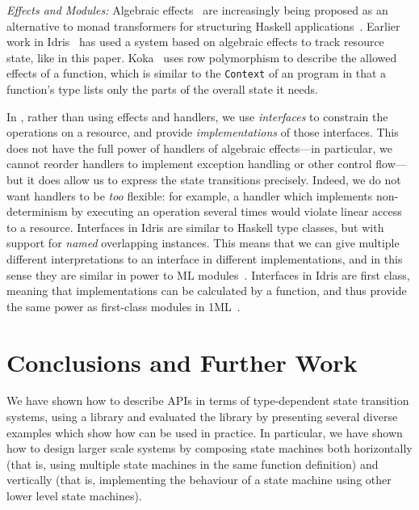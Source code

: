 
\emph{\textsf{Effects and Modules:}}
%
Algebraic effects~\citep{Plotkin2009,Bauer} are increasingly being proposed as
an alternative to monad transformers for structuring Haskell
applications~\citep{KiselyovEffects,handlers2013}.
Earlier work in Idris~\cite{brady-eff2013,brady-tfp14} has used a system
based on algebraic effects to track resource state, like \states{} in
this paper. 
Koka~\cite{Leijen2017} uses row polymorphism to describe the allowed effects
of a function, which is similar to the \texttt{Context} of an \states{}
program in that a function's type lists only the parts of the overall state it
needs.

In \states{}, rather than using effects and handlers, we use
\emph{interfaces} to constrain the operations on a resource, and provide
\emph{implementations} of those interfaces. This does not have the full
power of handlers of algebraic effects---in particular, we cannot reorder
handlers to implement exception handling or other control flow---but it
does allow us to express the state transitions precisely. Indeed, we do not
want handlers to be \emph{too} flexible: for example, a handler which
implements non-determinism by executing an operation several times would
violate linear access to a resource.
%
Interfaces in Idris are similar to Haskell type classes, but with support
for \emph{named} overlapping instances. This means that we can give multiple
different interpretations to an interface in different implementations, and
in this sense they are similar in power to ML modules~\citep{Dreyer2005}.
Interfaces in Idris are first class, meaning that implementations can be
calculated by a function, and thus provide the same power as first-class
modules in 1ML~\citep{rossberg2015}.

\section{Conclusions and Further Work}

We have shown how to describe APIs in terms of type-dependent state transition
systems, using a library \states{} and evaluated the library by presenting
several diverse examples which show how \states{} can be used in practice.
In particular, we have shown how to design larger scale systems by composing
state machines both horizontally (that is, using multiple state machines in the
same function definition) and vertically (that is, implementing the behaviour
of a state machine using other lower level state machines). 

